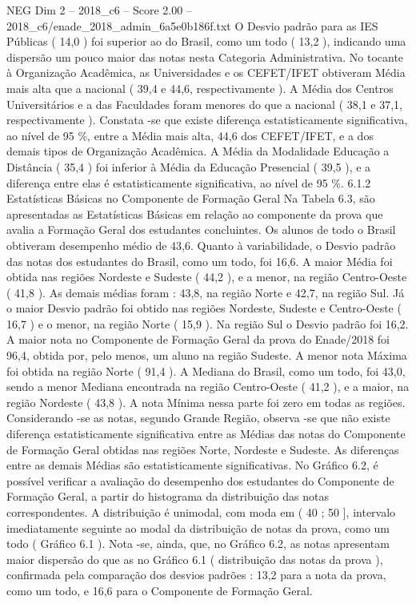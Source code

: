 \begin{textsample}{NEG Dim 2 – 2018\_c6 – Score 2.00 – 2018\_c6/enade\_2018\_admin\_6a5e0b186f.txt}
O Desvio padrão para as IES Públicas ( 14,0 ) foi superior ao do Brasil, como um todo ( 13,2 ), indicando uma dispersão um pouco maior das notas nesta Categoria Administrativa.
No tocante à Organização Acadêmica, as Universidades e os CEFET/IFET obtiveram Média mais alta que a nacional ( 39,4 e 44,6, respectivamente ).
A Média dos Centros Universitários e a das Faculdades foram menores do que a nacional ( 38,1 e 37,1, respectivamente ).
Constata -se que existe diferença estatisticamente significativa, ao nível de 95 \%, entre a Média mais alta, 44,6 dos CEFET/IFET, e a dos demais tipos de Organização Acadêmica.
A Média da Modalidade Educação a Distância ( 35,4 ) foi inferior à Média da Educação Presencial ( 39,5 ), e a diferença entre elas é estatisticamente significativa, ao nível de 95 \%. 6.1.2 Estatísticas Básicas no Componente de Formação Geral Na Tabela 6.3, são apresentadas as Estatísticas Básicas em relação ao componente da prova que avalia a Formação Geral dos estudantes concluintes.
Os alunos de todo o Brasil obtiveram desempenho médio de 43,6.
Quanto à variabilidade, o Desvio padrão das notas dos estudantes do Brasil, como um todo, foi 16,6.
A maior Média foi obtida nas regiões Nordeste e Sudeste ( 44,2 ), e a menor, na região Centro-Oeste ( 41,8 ).
As demais médias foram : 43,8, na região Norte e 42,7, na região Sul.
Já o maior Desvio padrão foi obtido nas regiões Nordeste, Sudeste e Centro-Oeste ( 16,7 ) e o menor, na região Norte ( 15,9 ).
Na região Sul o Desvio padrão foi 16,2.
A maior nota no Componente de Formação Geral da prova do Enade/2018 foi 96,4, obtida por, pelo menos, um aluno na região Sudeste.
A menor nota Máxima foi obtida na região Norte ( 91,4 ).
A Mediana do Brasil, como um todo, foi 43,0, sendo a menor Mediana encontrada na região Centro-Oeste ( 41,2 ), e a maior, na região Nordeste ( 43,8 ).
A nota Mínima nessa parte foi zero em todas as regiões.
Considerando -se as notas, segundo Grande Região, observa -se que não existe diferença estatisticamente significativa entre as Médias das notas do Componente de Formação Geral obtidas nas regiões Norte, Nordeste e Sudeste.
As diferenças entre as demais Médias são estatisticamente significativas.
No Gráfico 6.2, é possível verificar a avaliação do desempenho dos estudantes do Componente de Formação Geral, a partir do histograma da distribuição das notas correspondentes.
A distribuição é unimodal, com moda em ( 40 ; 50 ], intervalo imediatamente seguinte ao modal da distribuição de notas da prova, como um todo ( Gráfico 6.1 ).
Nota -se, ainda, que, no Gráfico 6.2, as notas apresentam maior dispersão do que as no Gráfico 6.1 ( distribuição das notas da prova ), confirmada pela comparação dos desvios padrões : 13,2 para a nota da prova, como um todo, e 16,6 para o Componente de Formação Geral.

\end{textsample}
